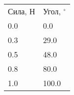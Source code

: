 \begin{tabular}{ll}
\hline
 Сила, Н & Угол, $^\circ$ \\
 0.0     & 0.0            \\
 0.3     & 29.0           \\
 0.5     & 48.0           \\
 0.8     & 80.0           \\
 1.0     & 100.0          \\
\hline
\end{tabular}